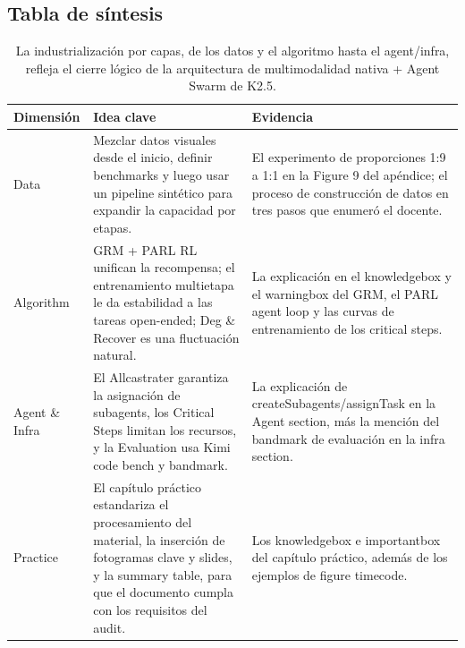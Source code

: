 \subsection{Tabla de síntesis}
\begin{table}[H]
\footnotesize
\centering
\begin{tabular}{p{3cm}p{7cm}p{4cm}}
\toprule
Dimensión & Idea clave & Evidencia \\
\midrule
Data & Mezclar datos visuales desde el inicio, definir benchmarks y luego usar un pipeline sintético para expandir la capacidad por etapas. & El experimento de proporciones 1:9 a 1:1 en la Figure 9 del apéndice; el proceso de construcción de datos en tres pasos que enumeró el docente. \\
Algorithm & GRM + PARL RL unifican la recompensa; el entrenamiento multietapa le da estabilidad a las tareas open-ended; Deg \& Recover es una fluctuación natural. & La explicación en el knowledgebox y el warningbox del GRM, el PARL agent loop y las curvas de entrenamiento de los critical steps. \\
Agent \& Infra & El Allcastrater garantiza la asignación de subagents, los Critical Steps limitan los recursos, y la Evaluation usa Kimi code bench y bandmark. & La explicación de createSubagents/assignTask en la Agent section, más la mención del bandmark de evaluación en la infra section. \\
Practice & El capítulo práctico estandariza el procesamiento del material, la inserción de fotogramas clave y slides, y la summary table, para que el documento cumpla con los requisitos del audit. & Los knowledgebox e importantbox del capítulo práctico, además de los ejemplos de figure timecode. \\
\bottomrule
\end{tabular}
\caption{La industrialización por capas, de los datos y el algoritmo hasta el agent/infra, refleja el cierre lógico de la arquitectura de multimodalidad nativa + Agent Swarm de K2.5.}
\end{table}

